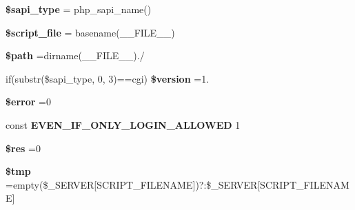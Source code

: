 \begin{DoxyCompactItemize}
\item 
\mbox{\label{tourneeunique__clients__commandes__expeditions_8php_a86e02f00a36d0fcbf274de973b2640d0}} 
{\bfseries \$sapi\+\_\+type} = php\+\_\+sapi\+\_\+name()
\item 
\mbox{\label{tourneeunique__clients__commandes__expeditions_8php_a97b9f047572d6c50f29fbea522f6c17e}} 
{\bfseries \$script\+\_\+file} = basename(\+\_\+\+\_\+\+F\+I\+L\+E\+\_\+\+\_\+)
\item 
\mbox{\label{tourneeunique__clients__commandes__expeditions_8php_a0a4baf0b22973c07685c3981f0d17fc4}} 
{\bfseries \$path} =dirname(\+\_\+\+\_\+\+F\+I\+L\+E\+\_\+\+\_\+).\textquotesingle{}/\textquotesingle{}
\item 
\mbox{\label{tourneeunique__clients__commandes__expeditions_8php_a0a351317886caa2358df1658880c0c78}} 
if(substr(\$sapi\+\_\+type, 0, 3)==\textquotesingle{}cgi\textquotesingle{}) {\bfseries \$version} =\textquotesingle{}1.\textquotesingle{}
\item 
\mbox{\label{tourneeunique__clients__commandes__expeditions_8php_aeba2ab722cedda53dbb7ec1a59f45550}} 
{\bfseries \$error} =0
\item 
\mbox{\label{tourneeunique__clients__commandes__expeditions_8php_a2b87986264c1ca3cddb96a106af7b37a}} 
const {\bfseries E\+V\+E\+N\+\_\+\+I\+F\+\_\+\+O\+N\+L\+Y\+\_\+\+L\+O\+G\+I\+N\+\_\+\+A\+L\+L\+O\+W\+ED} 1
\item 
\mbox{\label{tourneeunique__clients__commandes__expeditions_8php_a49a8a4009b02e49717caa88b128affc5}} 
{\bfseries \$res} =0
\item 
\mbox{\label{tourneeunique__clients__commandes__expeditions_8php_a57024d47cf8348153f5fdda16f8fefa9}} 
{\bfseries \$tmp} =empty(\$\+\_\+\+S\+E\+R\+V\+ER\mbox{[}\textquotesingle{}S\+C\+R\+I\+P\+T\+\_\+\+F\+I\+L\+E\+N\+A\+ME\textquotesingle{}\mbox{]})?\textquotesingle{}\textquotesingle{}\+:\$\+\_\+\+S\+E\+R\+V\+ER\mbox{[}\textquotesingle{}S\+C\+R\+I\+P\+T\+\_\+\+F\+I\+L\+E\+N\+A\+ME\textquotesingle{}\mbox{]}

\end{DoxyCompactItemize}
